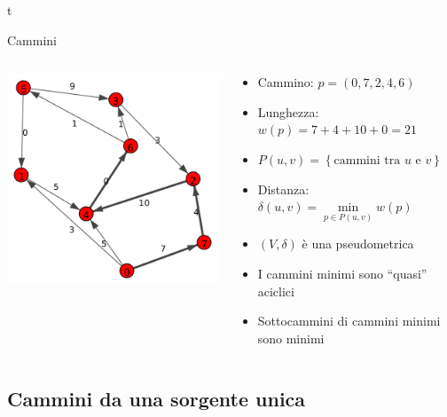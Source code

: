 t \documentclass{beamer}
\theoremstyle{plain}
\theoremstyle{definition}
\theoremstyle{remark}
\newcommand{\set}[1]{\left\{#1\right\}}
\newcommand{\pa}[1]{\left(#1\right)}
\begin{document}
\begin{frame}{Cammini}
  \begin{columns}
    \begin{column}{0.40\textwidth}
      \includegraphics[width=\textwidth]{directpath}
    \end{column}
    \begin{column}{0.58\textwidth}
      \begin{itemize}
      \item Cammino: $p = \pa{ 0,7,2, 4,6}$
      \item Lunghezza: $w(p) = 7+4+10+0 = 21$
      \item $P(u,v) = \set{\text{cammini tra }u\text{ e }v}$
      \item Distanza: $\delta (u,v) = \min \limits _{p\in P(u,v)}
        w(p)$
      \item $\pa{V,\delta}$ \`e una pseudometrica
      \item I cammini minimi sono ``quasi'' aciclici
      \item Sottocammini di cammini minimi sono minimi
      \end{itemize}
    \end{column}
  \end{columns}
\end{frame}

\subsection{Cammini da una sorgente unica}
\end{document}

